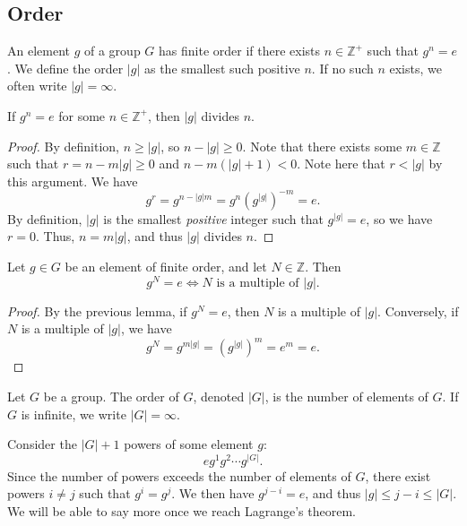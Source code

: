 \subsection{Order}
\begin{definition}[Order]\label{dfn:2.1.3}
	An element $g$ of a group $G$ has finite order if there exists $n\in\mathbb{Z}^+$ such that $g^n=e$. We define the order $\left| g \right| $ as the smallest such positive $n$. If no such $n$ exists, we often write $\left| g \right| =\infty$.
\end{definition}
\begin{lemma}\label{lma:2.1.1}
	If $g^n=e$ for some $n\in\mathbb{Z}^+$, then $\left| g \right| $ divides $n$.
\end{lemma}
\begin{proof}
	By definition, $n\geq \left| g \right| $, so $n-\left| g \right| \geq 0$. Note that there exists some $m\in\mathbb{Z}$ such that $r=n-m\left| g \right| \geq 0$ and $n-m(\left| g \right| +1)<0$. Note here that $r<\left| g \right| $ by this argument. We have
	\[
		g^r=g^{n-\left| g \right| m}=g^n\left(g^{\left| g \right| }\right)^{-m}=e
	.\]
	By definition, $\left| g \right| $ is the smallest \emph{positive} integer such that $g^{\left| g \right| }=e$, so we have $r=0$. Thus, $n=m\left| g \right| $, and thus $\left| g \right| $ divides $n$.
\end{proof}
\begin{corollary}\label{cor:2.1.1}
	Let $g\in G$ be an element of finite order, and let $N\in\mathbb{Z}$. Then
	\[
		g^N=e \iff N \text{ is a multiple of }\left| g \right| 
	.\]
\end{corollary}
\begin{proof}
	By the previous lemma, if $g^N=e$, then $N$ is a multiple of $\left| g \right| $. Conversely, if $N$ is a multiple of $\left| g \right| $, we have
	\[
		g^{N}=g^{m\left| g \right| }=\left( g^{\left| g \right| } \right) ^m=e^m=e
	.\]
\end{proof}
\begin{definition}\label{dfn:2.1.4}
	Let $G$ be a group. The order of $G$, denoted $\left| G \right| $, is the number of elements of $G$. If $G$ is infinite, we write $\left| G \right| =\infty$.
\end{definition}

Consider the $\left| G \right| +1$ powers of some element $g$:
\[
	eg^1g^2\cdots g^{\left| G \right| }
.\]
Since the number of powers exceeds the number of elements of $G$, there exist powers $i\neq j$ such that $g^i=g^j$. We then have $g^{j-i}=e$, and thus $\left| g \right| \leq j-i\leq \left| G \right| $. We will be able to say more once we reach Lagrange's theorem.

